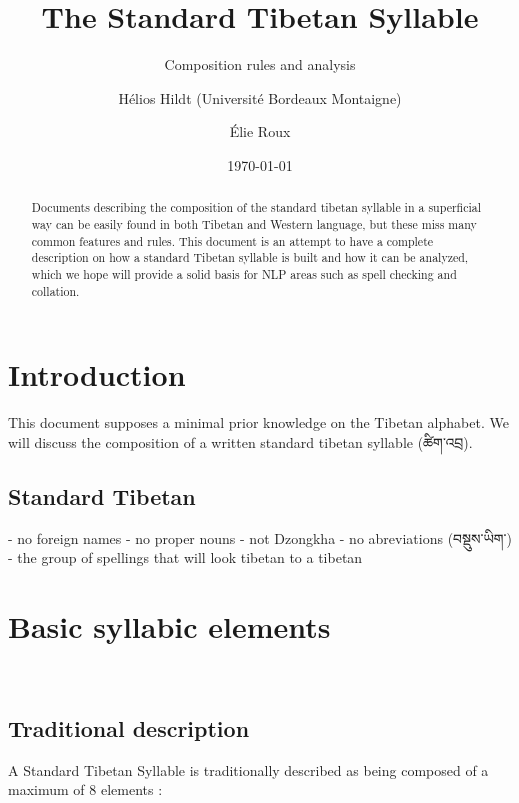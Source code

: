 \documentclass[%
a4paper,%
pagesize,%
12pt,%
parskip=off,%
bibliography=totoc,%
numbers=noenddot,%
DIV=12,%
twoside=semi,%
headings=normal%
]{scrartcl}
\title{The Standard Tibetan Syllable}
\subtitle{Composition rules and analysis}
\author{Hélios Hildt (Université Bordeaux Montaigne) \and Élie Roux}
\date{\today}
\begin{document}
\maketitle

\begin{abstract}
Documents describing the composition of the standard tibetan syllable in a superficial way can be easily found in both Tibetan and Western language, but these miss many common features and rules. This document is an attempt to have a complete description on how a standard Tibetan syllable is built and how it can be analyzed, which we hope will provide a solid basis for NLP areas such as spell checking and collation.
\end{abstract}


\tableofcontents

\newpage

\section*{Introduction}

This document supposes a minimal prior knowledge on the Tibetan alphabet. We will discuss the composition of a written standard tibetan syllable (ཚིག་འབྲ).

\subsection{Standard Tibetan}

- no foreign names
- no proper nouns
- not Dzongkha
- no abreviations (བསྡུས་ཡིག་)
- the group of spellings that will look tibetan to a tibetan

\section{Basic syllabic elements}

­\subsection{Traditional description}

A Standard Tibetan Syllable is traditionally described as being composed of a maximum of 8 elements :
\end{document}
